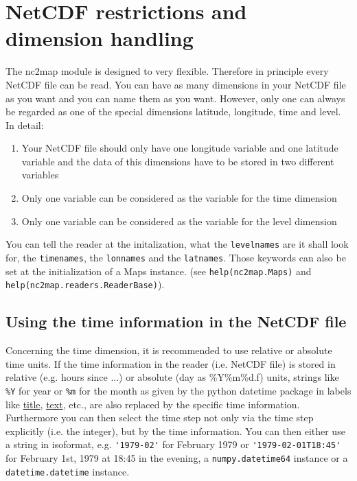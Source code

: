 \chapter{NetCDF restrictions and dimension handling}
The \gls{nc2map} module is designed to very flexible. Therefore in principle every NetCDF file can be read. You can have as many dimensions in your NetCDF file as you want and you can name them as you want. However, only one can always be regarded as one of the special dimensions latitude, longitude, time and level. In detail:
\begin{enumerate}
	\item Your NetCDF file should only have one longitude variable and one latitude variable and the data of this dimensions have to be stored in two different variables
	\item Only one variable can be considered as the variable for the time dimension
	\item Only one variable can be considered as the variable for the level dimension
\end{enumerate}
You can tell the \gls{reader} at the initalization, what the \lstinline|levelnames| are it shall look for, the \lstinline|timenames|, the \lstinline|lonnames| and the \lstinline|latnames|. Those keywords can also be set at the initialization of a \gls{Maps} instance. (see \lstinline|help(nc2map.Maps)| and \lstinline|help(nc2map.readers.ReaderBase)|).

\section{Using the time information in the NetCDF file} \label{sec:time}
Concerning the time dimension, it is recommended to use relative or absolute time units. If the time information in the \gls{reader} (i.e. NetCDF file) is stored in relative (e.g. hours since ...) or absolute (day as \%Y\%m\%d.f) units, strings like \lstinline|%Y| for year or \lstinline|%m| for the month as given by the python datetime package in labels like \hyperref[item:title]{title}, \hyperref[item:text]{text}, etc., are also replaced by the specific time information. Furthermore you can then select the time step not only via the time step explicitly (i.e. the integer), but by the time information. You can then either use a string in isoformat, e.g. \lstinline|'1979-02'| for February 1979 or \lstinline|'1979-02-01T18:45'| for February 1st, 1979 at 18:45 in the evening, a \lstinline|numpy.datetime64| instance or a \lstinline|datetime.datetime| instance.